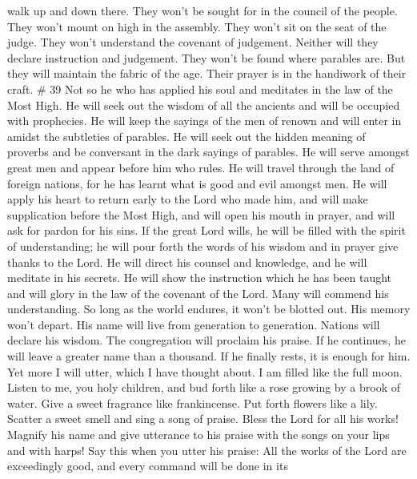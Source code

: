 walk up and down there.  They won't be sought for in the
council of the people. They won't mount on high in the assembly. They
won't sit on the seat of the judge. They won't understand the covenant
of judgement. Neither will they declare instruction and judgement. They
won't be found where parables are.  But they will maintain
the fabric of the age. Their prayer is in the handiwork of their craft.
\# 39  Not so he who has applied his soul and meditates in
the law of the Most High. He will seek out the wisdom of all the
ancients and will be occupied with prophecies.  He will keep
the sayings of the men of renown and will enter in amidst the subtleties
of parables.  He will seek out the hidden meaning of
proverbs and be conversant in the dark sayings of parables. 
He will serve amongst great men and appear before him who rules. He will
travel through the land of foreign nations, for he has learnt what is
good and evil amongst men.  He will apply his heart to
return early to the Lord who made him, and will make supplication before
the Most High, and will open his mouth in prayer, and will ask for
pardon for his sins.  If the great Lord wills, he will be
filled with the spirit of understanding; he will pour forth the words of
his wisdom and in prayer give thanks to the Lord.  He will
direct his counsel and knowledge, and he will meditate in his secrets.
 He will show the instruction which he has been taught and
will glory in the law of the covenant of the Lord.  Many
will commend his understanding. So long as the world endures, it won't
be blotted out. His memory won't depart. His name will live from
generation to generation.  Nations will declare his wisdom.
The congregation will proclaim his praise.  If he
continues, he will leave a greater name than a thousand. If he finally
rests, it is enough for him.  Yet more I will utter, which
I have thought about. I am filled like the full moon. 
Listen to me, you holy children, and bud forth like a rose growing by a
brook of water.  Give a sweet fragrance like frankincense.
Put forth flowers like a lily. Scatter a sweet smell and sing a song of
praise. Bless the Lord for all his works!  Magnify his name
and give utterance to his praise with the songs on your lips and with
harps! Say this when you utter his praise:  All the works
of the Lord are exceedingly good, and every command will be done in its
